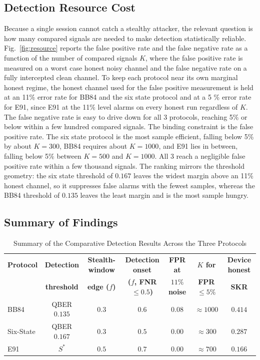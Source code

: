 \documentclass[conference]{IEEEtran}
\begin{document}
\subsection{Detection Resource Cost}
\label{subsec:resource}
Because a single session cannot catch a stealthy attacker, the relevant question
is how many compared signals are needed to make detection statistically reliable.
Fig.~\ref{fig:resource} reports the false positive rate and the false negative
rate as a function of the number of compared signals $K$, where the false positive
rate is measured on a worst case honest noisy channel and the false negative rate
on a fully intercepted clean channel. To keep each protocol near its own marginal
honest regime, the honest channel used for the false positive measurement is held
at an 11\% error rate for BB84 and the six state protocol and at a 5
\% error rate for E91, since E91 at the 11\% level alarms on every
honest run regardless of $K$. The false negative rate is easy to drive down for
all 3 protocols, reaching 5\% or below within a few hundred compared
signals. The binding constraint is the false positive rate. The six state protocol
is the most sample efficient, falling below 5\% by about $K = 300$, BB84
requires about $K = 1000$, and E91 lies in between, falling below 5\%
between $K = 500$ and $K = 1000$. All 3 reach a negligible false positive rate
within a few thousand signals. The ranking mirrors the threshold geometry: the six
state threshold of $0.167$ leaves the widest margin above an 11\% honest
channel, so it suppresses false alarms with the fewest samples, whereas the BB84
threshold of $0.135$ leaves the least margin and is the most sample hungry.

\subsection{Summary of Findings}

\begin{table}[t]
\caption{Summary of the Comparative Detection Results Across the Three Protocols}
\label{tab:summary}
\begin{center}
\setlength{\tabcolsep}{6pt}
\renewcommand{\arraystretch}{1.3}
\footnotesize
\begin{tabular}{|l|c|c|c|c|c|c|}
\hline
\textbf{Protocol} & \textbf{Detection} & \textbf{Stealth-window} & \textbf{Detection onset} & \textbf{FPR at} & \textbf{$K$ for} & \textbf{Device honest} \\
 & \textbf{threshold} & \textbf{edge ($f$)} & \textbf{($f$, FNR $\le 0.5$)} & \textbf{$11\%$ noise} & \textbf{FPR $\le 5\%$} & \textbf{SKR} \\ \hline
BB84      & QBER $0.135$ & $0.3$ & $0.6$ & $0.08$ & $\approx 1000$ & $0.414$ \\ \hline
Six-State & QBER $0.167$ & $0.3$ & $0.5$ & $0.00$ & $\approx 300$  & $0.287$ \\ \hline
E91 & $S^{*}$ & $0.5$ & $0.7$ & $0.00$ & $\approx 700$ & $0.166$ \\ \hline
\end{tabular}
\end{center}
\end{table}
\end{document}
